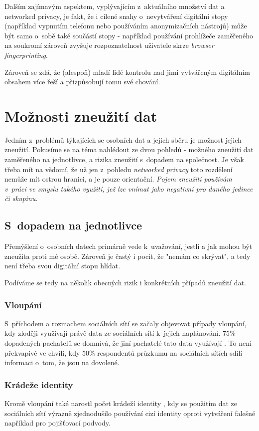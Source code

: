 Dalším zajímavým aspektem, vyplývajícím z~aktuálního množství dat a networked privacy, je fakt, že i cílené snahy o~nevytváření digitální stopy (například vypnutím telefonu nebo používáním anonymizačních nástrojů) může být samo o~sobě také součástí stopy - například používání prohlížeče zaměřeného na soukromí zároveň zvyšuje rozpoznatelnost uživatele skrze \textit{browser fingerprinting}.

Zároveň se zdá, že (alespoň) mladí lidé kontrolu nad jimi vytvářeným digitálním obsahem více řeší a přizpůsobují tomu své chování\citep{youth-online-behavior}.

\section{Možnosti zneužití dat}
Jedním z~problémů týkajících se osobních dat a jejich sběru je možnost jejich zneužití. Pokusíme se na téma nahlédout ze dvou pohledů - možného zneužití dat zaměřeného na jednotlivce, a rizika zneužití s~dopadem na společnost. Je však třeba mít na vědomí, že už jen z~pohledu \textit{networked privacy} toto rozdělení nemůže mít ostrou hranici, a je pouze orientační.
\textit{Pojem zneužití používám v~práci ve smyslu takého využití, jež lze vnímat jako negativní pro daného jedince či skupinu.}

\subsection{S~dopadem na jednotlivce}
Přemýšlení o~osobních datech primárně vede k~uvažování, jestli a jak mohou být zneužita proti mé osobě. Zároveň je častý i pocit, že "nemám co skrývat", a tedy není třeba svou digitální stopu hlídat.

Podíváme se tedy na několik obecných rizik i konkrétních případů zneužití dat.

\subsubsection{Vloupání}
S~příchodem a rozmachem sociálních sítí se začaly objevovat případy vloupání, kdy zloději využívají právě data ze sociálních sítí k~jejich naplánování. 75\% dopadených pachatelů se domnívá, že jiní pachatelé tato data využívají \citep{burglary}.
To není překvapivé ve chvíli, kdy 50\% respondentů průzkumu na sociálních sítích sdílí informaci o~tom, že jsou na dovolené.\citep{burglary} 

\subsubsection{Krádeže identity}
Kromě vloupání také narostl počet krádeží identity \citep{identity-theft-rise}, kdy se použitím dat ze sociálních sítí výrazně zjednodušilo používání cizí identity oproti vytváření falešné například pro pojišťovací podvody. 


